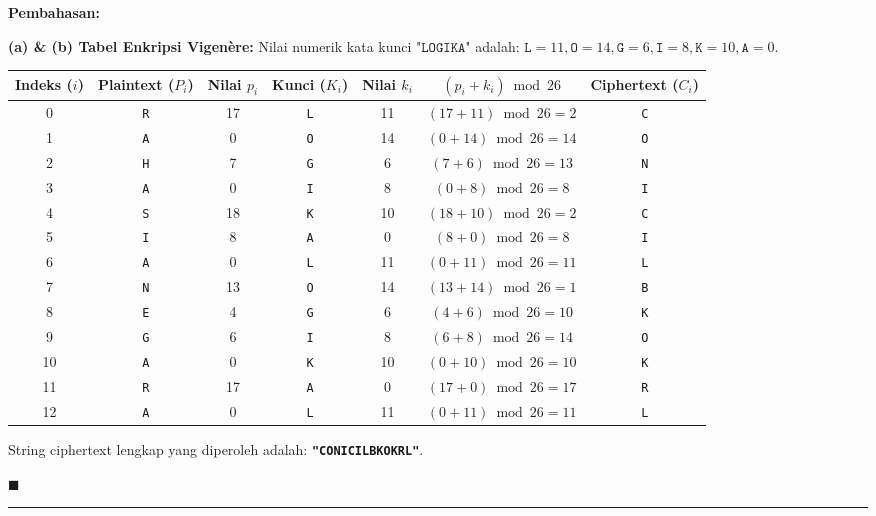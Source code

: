 \documentclass[11pt,a4paper]{article}
\newenvironment{solusi}{\noindent\textbf{\textsf{Pembahasan:}}\par\vspace{0.2em}}{\hfill$\blacksquare$\vspace{1em}\par\hrule\vspace{1em}}
\begin{document}
\begin{solusi}
\textbf{(a) \& (b) Tabel Enkripsi Vigenère:}
Nilai numerik kata kunci $\texttt{"LOGIKA"}$ adalah: $\texttt{L}=11, \texttt{O}=14, \texttt{G}=6, \texttt{I}=8, \texttt{K}=10, \texttt{A}=0$.
\begin{center}
\footnotesize
\begin{tabular}{c c c c c c c}
\toprule
\textbf{Indeks ($i$)} & \textbf{Plaintext ($P_i$)} & \textbf{Nilai $p_i$} & \textbf{Kunci ($K_i$)} & \textbf{Nilai $k_i$} & $(p_i + k_i) \bmod 26$ & \textbf{Ciphertext ($C_i$)} \\
\midrule
0  & \texttt{R} & 17 & \texttt{L} & 11 & $(17 + 11) \bmod 26 = 2$  & \texttt{C} \\
1  & \texttt{A} & 0  & \texttt{O} & 14 & $(0 + 14) \bmod 26 = 14$  & \texttt{O} \\
2  & \texttt{H} & 7  & \texttt{G} & 6  & $(7 + 6) \bmod 26 = 13$   & \texttt{N} \\
3  & \texttt{A} & 0  & \texttt{I} & 8  & $(0 + 8) \bmod 26 = 8$    & \texttt{I} \\
4  & \texttt{S} & 18 & \texttt{K} & 10 & $(18 + 10) \bmod 26 = 2$  & \texttt{C} \\
5  & \texttt{I} & 8  & \texttt{A} & 0  & $(8 + 0) \bmod 26 = 8$    & \texttt{I} \\
6  & \texttt{A} & 0  & \texttt{L} & 11 & $(0 + 11) \bmod 26 = 11$  & \texttt{L} \\
7  & \texttt{N} & 13 & \texttt{O} & 14 & $(13 + 14) \bmod 26 = 1$  & \texttt{B} \\
8  & \texttt{E} & 4  & \texttt{G} & 6  & $(4 + 6) \bmod 26 = 10$   & \texttt{K} \\
9  & \texttt{G} & 6  & \texttt{I} & 8  & $(6 + 8) \bmod 26 = 14$   & \texttt{O} \\
10 & \texttt{A} & 0  & \texttt{K} & 10 & $(0 + 10) \bmod 26 = 10$  & \texttt{K} \\
11 & \texttt{R} & 17 & \texttt{A} & 0  & $(17 + 0) \bmod 26 = 17$  & \texttt{R} \\
12 & \texttt{A} & 0  & \texttt{L} & 11 & $(0 + 11) \bmod 26 = 11$  & \texttt{L} \\
\bottomrule
\end{tabular}
\end{center}
String ciphertext lengkap yang diperoleh adalah: \textbf{\texttt{"CONICILBKOKRL"}}.


\end{solusi}
\end{document}
